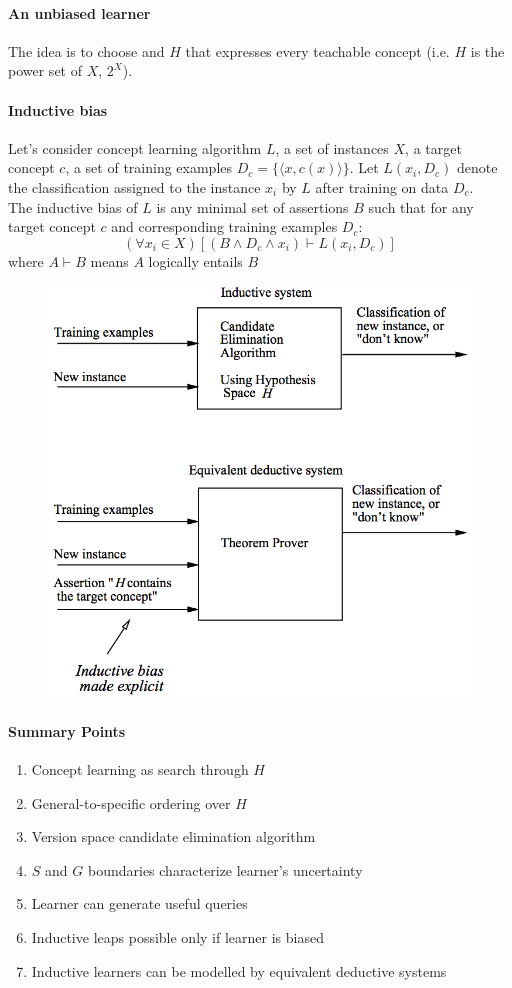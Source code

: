 \paragraph{An unbiased learner} The idea is to choose and $H$ that expresses every teachable concept (i.e. $H$ is the power set of $X$, $2^X$).

\paragraph{Inductive bias} Let's consider concept learning algorithm $L$, a set of instances $X$, a target concept $c$, a set of training examples $D_c = \{ \langle x, c(x) \rangle \}$. Let $L(x_i, D_c)$ denote the classification assigned to the instance $x_i$ by $L$ after training on data $D_c$.\\
\linebreak The inductive bias of $L$ is any minimal set of assertions $B$ such that for any target
concept $c$ and corresponding training
examples $D_c$:
\begin{equation*}
(\forall x_i \in X) [ ( B \wedge D_c \wedge x_i) \vdash L(x_i, D_c)]
\end{equation*}
where $A \vdash B$ means $A$ logically entails $B$

\begin{figure}[h]
    \centering
    \includegraphics[width=0.7\linewidth]{img/inductivebias}
\end{figure}

\paragraph{Summary Points}
\begin{enumerate}
    \item Concept learning as search through $H$
    \item General-to-specific ordering over $H$
    \item Version space candidate elimination algorithm
    \item $S$ and $G$ boundaries characterize learner's uncertainty
    \item Learner can generate useful queries
    \item Inductive leaps possible only if learner is biased
    \item Inductive learners can be modelled by equivalent deductive systems
\end{enumerate}